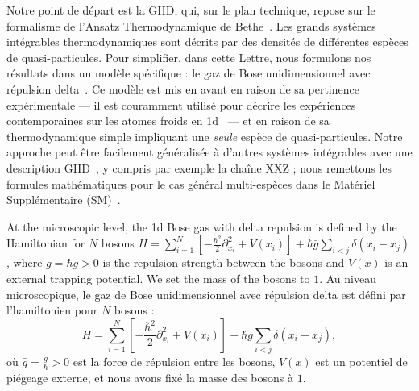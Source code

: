 \documentclass[twocolumn,amsfonts,showpacs,superscriptaddress]{revtex4-1}
\newcommand{\trad}[1]{\textcolor{myblue}{#1}}
\begin{document}
\trad{Notre point de départ est la GHD, qui, sur le plan technique, repose sur le formalisme de l'Ansatz Thermodynamique de Bethe~\cite{yang1969thermodynamics,takahashi2005thermodynamics}. Les grands systèmes intégrables thermodynamiques sont décrits par des densités de différentes espèces de quasi-particules. Pour simplifier, dans cette Lettre, nous formulons nos résultats dans un modèle spécifique : le gaz de Bose unidimensionnel avec répulsion delta~\cite{lieb1963exact,berezin1964schrodinger,korepin1997quantum}. Ce modèle est mis en avant en raison de sa pertinence expérimentale — il est couramment utilisé pour décrire les expériences contemporaines sur les atomes froids en 1d~\cite{olshanii1998atomic,van2008yang,vogler2013thermodynamics,schemmer2019generalized,wilson2019observation} — et en raison de sa thermodynamique simple impliquant une {\it seule} espèce de quasi-particules. Notre approche peut être facilement généralisée à d'autres systèmes intégrables avec une description GHD~\cite{piroli2017transport,ilievski2017microscopic,ilievski2017ballistic,doyon2017large,doyon2017drude,bulchandani2018bethe,collura2018analytic,doyon2018soliton,cao2018incomplete,doyon2018exact,bastianello2018generalized,de2018hydrodynamic,10.21468/SciPostPhys.6.4.049,gopalakrishnan2018hydrodynamics,mazza2018energy,vu2018equations,borsi2019current,doyon2019generalised,bulchandani2019kinetic,spohn2019generalized,bastianello2019generalized,panfil2019linearized,alba2019towards,agrawal2019generalized,cubero2019generalized,bertini2019GHD,mestyan2019GHD,bertini2018GHD,bertini2019GHDb,mestyan2019GHDb}, y compris par exemple la chaîne XXZ ; nous remettons les formules mathématiques pour le cas général multi-espèces dans le Matériel Supplémentaire (SM)~\cite{SM}.}




At the microscopic level, the 1d Bose gas with delta repulsion is defined by the Hamiltonian for $N$ bosons $H = \sum_{i=1}^N [-\frac{\hbar^2}{2} \partial_{x_i}^2 + V(x_i)] + \hbar \bar{g} \sum_{i<j} \delta(x_i-x_j) $, where $g = \hbar \bar{g} >0$ is the repulsion strength between the bosons and $V(x)$ is an external trapping potential. 
We set the mass of the bosons to $1$. 
\trad{Au niveau microscopique, le gaz de Bose unidimensionnel avec répulsion delta est défini par l'hamiltonien pour \( N \) bosons :
\[ H = \sum_{i=1}^N \left[ -\frac{\hbar^2}{2} \partial_{x_i}^2 + V(x_i) \right] + \hbar \bar{g} \sum_{i<j} \delta(x_i-x_j), \]
où \( \bar{g} = \frac{g}{\hbar} > 0 \) est la force de répulsion entre les bosons, \( V(x) \) est un potentiel de piégeage externe, et nous avons fixé la masse des bosons à \( 1 \).
}
\end{document}
